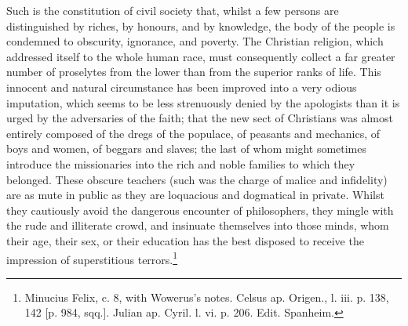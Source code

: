 Such is the constitution of civil society that, whilst a few persons are distinguished by riches, by honours, and by knowledge, the body of the people is condemned to obscurity, ignorance, and poverty. The Christian religion, which addressed itself to the whole human race, must consequently collect a far greater number of proselytes from the lower than from the superior ranks of life. This innocent and natural circumstance has been improved into a very odious imputation, which seems to be less strenuously denied by the apologists than it is urged by the adversaries of the faith; that the new sect of Christians was almost entirely composed of the dregs of the populace, of peasants and mechanics, of boys and women, of beggars and slaves; the last of whom might sometimes introduce the missionaries into the rich and noble families to which they belonged. These obscure teachers (such was the charge of malice and infidelity) are as mute in public as they are loquacious and dogmatical in private. Whilst they cautiously avoid the dangerous encounter of philosophers, they mingle with the rude and illiterate crowd, and insinuate themselves into those minds, whom their age, their sex, or their education has the best disposed to receive the impression of superstitious terrors.\footnote{Minucius Felix, c. 8, with Wowerus\texthebrew{}’s notes. Celsus ap. Origen., l. iii. p. 138, 142 [p. 984, sqq.]. Julian ap. Cyril. l. vi. p. 206. Edit. Spanheim.}

